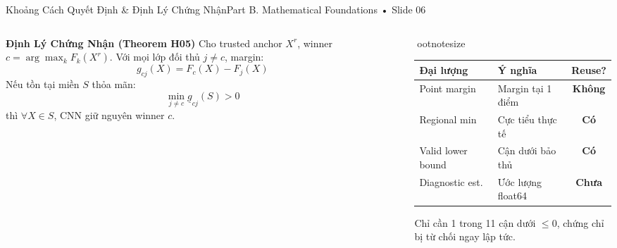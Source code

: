 \documentclass[aspectratio=169, 10pt]{beamer}
\begin{document}
\begin{frame}{Khoảng Cách Quyết Định \& Định Lý Chứng Nhận}{Part B. Mathematical Foundations • Slide 06}
    \begin{columns}
        \begin{column}{0.52\textwidth}
            \begin{block}{\textbf{Định Lý Chứng Nhận (Theorem H05)}}
                Cho trusted anchor $X^r$, winner $c = \arg\max_k F_k(X^r)$.
                Với mọi lớp đối thủ $j \neq c$, margin:
                $$g_{cj}(X) = F_c(X) - F_j(X)$$
                Nếu tồn tại miền $S$ thỏa mãn:
                $$\boxed{\min_{j \neq c} \underline{g}_{cj}(S) > 0}$$
                thì $\forall X \in S$, CNN giữ nguyên winner $c$.
            \end{block}
        \end{column}
        \begin{column}{0.44\textwidth}
            ootnotesize\setlength{	abcolsep}{3pt}
            \begin{tabular}{llc}
                \toprule
                \textbf{Đại lượng} & \textbf{Ý nghĩa} & \textbf{Reuse?} \\
                \midrule
                Point margin & Margin tại 1 điểm & \textcolor{AlertRed}{\textbf{Không}} \\
                Regional min & Cực tiểu thực tế & \textcolor{MintGreen}{\textbf{Có}} \\
                Valid lower bound & Cận dưới bảo thủ & \textcolor{MintGreen}{\textbf{Có}} \\
                Diagnostic est. & Ước lượng float64 & \textcolor{WarnAmber}{\textbf{Chưa}} \\
                \bottomrule
            \end{tabular}
            \vspace{0.2cm}
            \footnotesize
            Chỉ cần 1 trong 11 cận dưới $\le 0$, chứng chỉ bị từ chối ngay lập tức.
        \end{column}
    \end{columns}
\end{frame}
\end{document}
